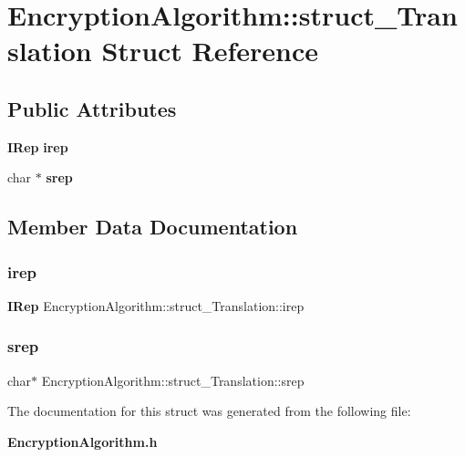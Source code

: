 \section{Encryption\+Algorithm\+:\+:struct\+\_\+\+Translation Struct Reference}
\label{structEncryptionAlgorithm_1_1struct__Translation}
\subsection*{Public Attributes}
\begin{DoxyCompactItemize}
\item 
\textbf{ I\+Rep} \textbf{ irep}
\item 
char $\ast$ \textbf{ srep}
\end{DoxyCompactItemize}


\subsection{Member Data Documentation}
\mbox{\label{structEncryptionAlgorithm_1_1struct__Translation_a94804ed1cda3054c2b57f9bb6d51993c}} 
\subsubsection{irep}
{\footnotesize\ttfamily \textbf{ I\+Rep} Encryption\+Algorithm\+::struct\+\_\+\+Translation\+::irep}

\mbox{\label{structEncryptionAlgorithm_1_1struct__Translation_a0bd39117150f7b3c0f02d71a39441287}} 
\subsubsection{srep}
{\footnotesize\ttfamily char$\ast$ Encryption\+Algorithm\+::struct\+\_\+\+Translation\+::srep}



The documentation for this struct was generated from the following file\+:\begin{DoxyCompactItemize}
\item 
\textbf{ Encryption\+Algorithm.\+h}\end{DoxyCompactItemize}
